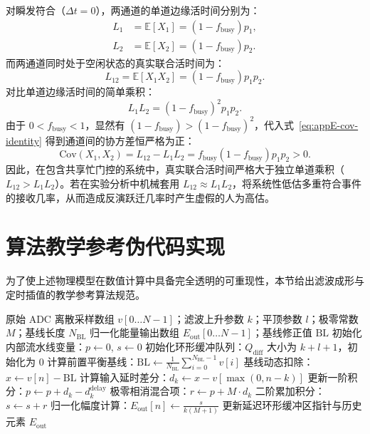 对瞬发符合（$\Delta t = 0$），两通道的单道边缘活时间分别为：
\begin{align}
L_1 &= \mathbb{E}[X_1] = (1 - f_{\mathrm{busy}}) p_1, \label{eq:appE-l1} \\
L_2 &= \mathbb{E}[X_2] = (1 - f_{\mathrm{busy}}) p_2. \label{eq:appE-l2}
\end{align}
而两通道同时处于空闲状态的真实联合活时间为：
\begin{equation}\label{eq:appE-l12-shared}
L_{12} = \mathbb{E}[X_1 X_2] = (1 - f_{\mathrm{busy}}) p_1 p_2.
\end{equation}
对比单道边缘活时间的简单乘积：
\begin{equation}\label{eq:appE-l1l2-product}
L_1 L_2 = (1 - f_{\mathrm{busy}})^2 p_1 p_2.
\end{equation}
由于 $0 < f_{\mathrm{busy}} < 1$，显然有 $(1 - f_{\mathrm{busy}}) > (1 - f_{\mathrm{busy}})^2$，代入式~\eqref{eq:appE-cov-identity} 得到通道间的协方差恒严格为正：
\begin{equation}\label{eq:appE-cov-positive}
\mathrm{Cov}(X_1, X_2) = L_{12} - L_1 L_2 = f_{\mathrm{busy}} (1 - f_{\mathrm{busy}}) p_1 p_2 > 0.
\end{equation}
因此，在包含共享忙门控的系统中，真实联合活时间严格大于独立单道乘积（$L_{12} > L_1 L_2$）。若在实验分析中机械套用 $L_{12} \approx L_1 L_2$，将系统性低估多重符合事件的接收几率，从而造成反演跃迁几率时产生虚假的人为高估。

\section{算法教学参考伪代码实现}\label{sec:appE-pseudocode}

为了使上述物理模型在数值计算中具备完全透明的可重现性，本节给出滤波成形与定时插值的教学参考算法规范。

\begin{algorithm}[!htbp]
\caption{数字梯形滤波与极零相消流水线定点参考算法}\label{alg:appE-trapezoid}
\begin{algorithmic}[1]
\Require 原始 ADC 离散采样数组 $v[0 \dots N-1]$；滤波上升参数 $k$；平顶参数 $l$；极零常数 $M$；基线长度 $N_{\mathrm{BL}}$
\Ensure 归一化能量输出数组 $E_{\mathrm{out}}[0 \dots N-1]$；基线修正值 $\mathrm{BL}$
\State 初始化内部流水线变量：$p \gets 0$, $s \gets 0$
\State 初始化环形缓冲队列：$Q_{\mathrm{diff}}$ 大小为 $k+l+1$，初始化为 0
\State 计算前置平衡基线：$\mathrm{BL} \gets \frac{1}{N_{\mathrm{BL}}} \sum_{i=0}^{N_{\mathrm{BL}}-1} v[i]$
    \State 基线动态扣除：$x \gets v[n] - \mathrm{BL}$
    \State 计算输入延时差分：$d_k \gets x - v[\max(0, n - k)]$
    \State 更新一阶积分：$p \gets p + d_k - d_k^{\mathrm{delay}}$ 
    \State 极零相消混合项：$r \gets p + M \cdot d_k$
    \State 二阶累加积分：$s \gets s + r$
    \State 归一化幅度计算：$E_{\mathrm{out}}[n] \gets \frac{s}{k (M + 1)}$ 
    \State 更新延迟环形缓冲区指针与历史元素
\EndFor
\State \Return $E_{\mathrm{out}}$
\end{algorithmic}
\end{algorithm}

